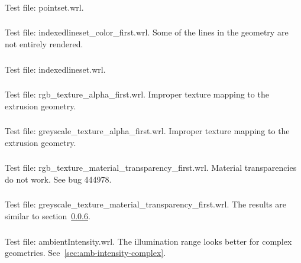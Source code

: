 \subsubsection{\MatOa\MatOb}
Test file: pointset.wrl.

\subsubsection{\MatPa\MatPb}
Test file: indexedlineset\_color\_first.wrl.\newline
Some of the lines in the geometry are not entirely rendered.

\subsubsection{\MatQa\MatQb}
Test file: indexedlineset.wrl.

\subsubsection{\MatRa\MatRb}
Test file: rgb\_texture\_alpha\_first.wrl.\newline
Improper texture mapping to the extrusion geometry.

\subsubsection{\MatSa\MatSb}
Test file: greyscale\_texture\_alpha\_first.wrl.\newline
Improper texture mapping to the extrusion geometry.

\subsubsection{\MatTa\MatTb}
\label{sec:rgb-texture-mat-transparency}
Test file: rgb\_texture\_material\_transparency\_first.wrl.\newline
Material transparencies do not work.
See bug 444978.

\subsubsection{\MatUa\MatUb}
Test file: greyscale\_texture\_material\_transparency\_first.wrl.\newline
The results are similar to section~\ref{sec:rgb-texture-mat-transparency}.

\subsubsection{\MatV}
Test file: ambientIntensity.wrl.\newline
The illumination range looks better for complex geometries.
See~\ref{sec:amb-intensity-complex}.

